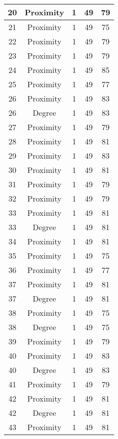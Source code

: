 \documentclass[results.tex]{subfiles}
\begin{document}
\begin{center}
\begin{tabular}{| c || c | c | c | c |}
    \hline
    20 & Proximity & 1 & 49 & 79 \\ 
    \hline
    21 & Proximity & 1 & 49 & 75 \\ 
    \hline
    22 & Proximity & 1 & 49 & 79 \\ 
    \hline
    23 & Proximity & 1 & 49 & 79 \\ 
    \hline
    24 & Proximity & 1 & 49 & 85 \\ 
    \hline
    25 & Proximity & 1 & 49 & 77 \\ 
    \hline
    26 & Proximity & 1 & 49 & 83 \\ 
    \hline
    26 & Degree & 1 & 49 & 83 \\ 
    \hline
    27 & Proximity & 1 & 49 & 79 \\ 
    \hline
    28 & Proximity & 1 & 49 & 81 \\ 
    \hline
    29 & Proximity & 1 & 49 & 83 \\ 
    \hline
    30 & Proximity & 1 & 49 & 81 \\ 
    \hline
    31 & Proximity & 1 & 49 & 79 \\ 
    \hline
    32 & Proximity & 1 & 49 & 79 \\ 
    \hline
    33 & Proximity & 1 & 49 & 81 \\ 
    \hline
    33 & Degree & 1 & 49 & 81 \\ 
    \hline
    34 & Proximity & 1 & 49 & 81 \\ 
    \hline
    35 & Proximity & 1 & 49 & 75 \\ 
    \hline
    36 & Proximity & 1 & 49 & 77 \\ 
    \hline
    37 & Proximity & 1 & 49 & 81 \\ 
    \hline
    37 & Degree & 1 & 49 & 81 \\ 
    \hline
    38 & Proximity & 1 & 49 & 75 \\ 
    \hline
    38 & Degree & 1 & 49 & 75 \\ 
    \hline
    39 & Proximity & 1 & 49 & 79 \\ 
    \hline
    40 & Proximity & 1 & 49 & 83 \\ 
    \hline
    40 & Degree & 1 & 49 & 83 \\ 
    \hline
    41 & Proximity & 1 & 49 & 79 \\ 
    \hline
    42 & Proximity & 1 & 49 & 81 \\ 
    \hline
    42 & Degree & 1 & 49 & 81 \\ 
    \hline
    43 & Proximity & 1 & 49 & 81 \\ 

\end{tabular}
\end{center}
\end{document}
